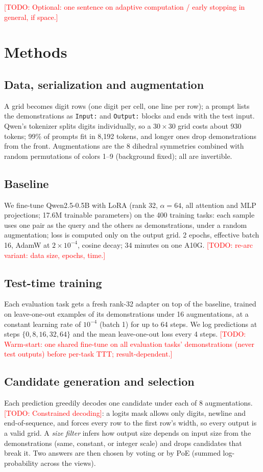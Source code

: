 \documentclass{article}
\newcommand{\todo}[1]{\textcolor{red}{[TODO: #1]}}
\begin{document}
\todo{Optional: one sentence on adaptive computation / early stopping in general, if space.}

\section{Methods}

\subsection{Data, serialization and augmentation}
A grid becomes digit rows (one digit per cell, one line per row); a prompt lists the demonstrations as \texttt{Input:} and \texttt{Output:} blocks and ends with the test input. Qwen's tokenizer splits digits individually, so a $30\times30$ grid costs about 930 tokens; 99\% of prompts fit in 8,192 tokens, and longer ones drop demonstrations from the front. Augmentations are the 8 dihedral symmetries combined with random permutations of colors 1--9 (background fixed); all are invertible.

\subsection{Baseline}
We fine-tune Qwen2.5-0.5B \cite{qwen2024qwen25} with LoRA (rank 32, $\alpha=64$, all attention and MLP projections; 17.6M trainable parameters) on the 400 training tasks: each sample uses one pair as the query and the others as demonstrations, under a random augmentation; loss is computed only on the output grid. 2 epochs, effective batch 16, AdamW at $2\times10^{-4}$, cosine decay; 34 minutes on one A10G. \todo{re-arc variant: data size, epochs, time.}

\subsection{Test-time training}
Each evaluation task gets a fresh rank-32 adapter on top of the baseline, trained on leave-one-out examples of its demonstrations under 16 augmentations, at a constant learning rate of $10^{-4}$ (batch 1) for up to 64 steps. We log predictions at steps $\{0,8,16,32,64\}$ and the mean leave-one-out loss every 4 steps. \todo{Warm-start: one shared fine-tune on all evaluation tasks' demonstrations (never test outputs) before per-task TTT; result-dependent.}

\subsection{Candidate generation and selection}
Each prediction greedily decodes one candidate under each of 8 augmentations. \todo{Constrained decoding}: a logits mask allows only digits, newline and end-of-sequence, and forces every row to the first row's width, so every output is a valid grid. A \emph{size filter} infers how output size depends on input size from the demonstrations (same, constant, or integer scale) and drops candidates that break it. Two answers are then chosen by voting or by PoE (summed log-probability across the views).
\end{document}
